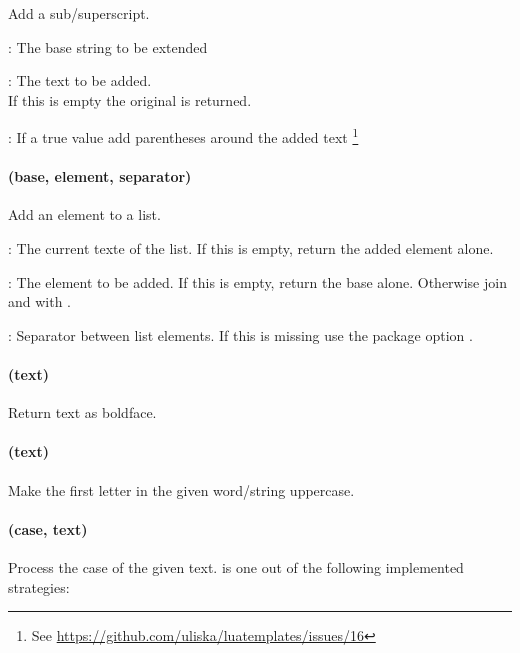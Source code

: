 \documentclass[12pt]{scrartcl}
\begin{document}
Add a sub/superscript.

\begin{itemize*}
\item {}: The base string to be extended
\item {}: The text to be added.\\If this is empty the original
 is returned.
\item {}: If a true value add parentheses around the added text%
\footnote{See \url{https://github.com/uliska/luatemplates/issues/16}}
\end{itemize*}


\paragraph{ (base, element, separator)}

Add an element to a list.

\begin{itemize*}
\item {}: The current texte of the list. If this is empty, return
the added element alone.
\item {}: The element to be added. If this is empty, return the base
alone.  Otherwise join  and  with .
\item {}: Separator between list elements.  If this is missing
use the package option .
\end{itemize*}


\paragraph{ (text)}

Return text as boldface.

\paragraph{ (text)}

Make the first letter in the given word/string uppercase.


\paragraph{ (case, text)}

Process the case of the given text.   is one out of the following
implemented strategies:
\end{document}
